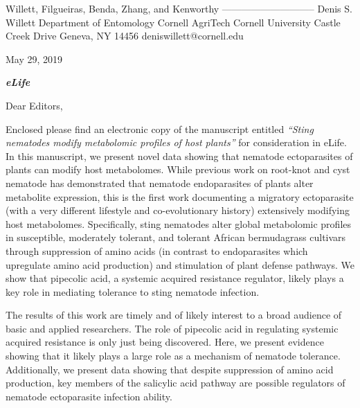 \documentclass{article}
\begin{document}
\begin{addmargin}[2.8in]{}
Willett, Filgueiras, \newline
Benda, Zhang, and Kenworthy \newline
----------------------------- \newline
Denis S. Willett\newline
Department of Entomology \newline
Cornell AgriTech  \newline
Cornell University  Castle Creek Drive \newline
Geneva, NY 14456 \newline
deniswillett@cornell.edu \newline
\end{addmargin}
\setlength{\parindent}{0cm}

May 29, 2019

\vspace{1.24em}

\textbf{\textit{eLife}}

\vspace{1.24em}

Dear Editors,

\vspace{0.48em}
\setlength{\parindent}{1.24cm}

Enclosed please find an electronic copy of the manuscript entitled \textit{“Sting nematodes modify metabolomic profiles of host plants”} for consideration in eLife.  In this manuscript, we present novel data showing that nematode ectoparasites of plants can modify host metabolomes.  While previous work on root-knot and cyst nematode has demonstrated that nematode endoparasites of plants alter metabolite expression, this is the first work documenting a migratory ectoparasite (with a very different lifestyle and co-evolutionary history) extensively modifying host metabolomes.  Specifically, sting nematodes alter global metabolomic profiles in susceptible, moderately tolerant, and tolerant African bermudagrass cultivars through suppression of amino acids (in contrast to endoparasites which upregulate amino acid production) and stimulation of plant defense pathways.  We show that pipecolic acid, a systemic acquired resistance regulator, likely plays a key role in mediating tolerance to sting nematode infection.  


The results of this work are timely and of likely interest to a broad audience of basic and applied researchers. The role of pipecolic acid in regulating systemic acquired resistance is only just being discovered.  Here, we present evidence showing that it likely plays a large role as a mechanism of nematode tolerance.  Additionally, we present data showing that despite suppression of amino acid production, key members of the salicylic acid pathway are possible regulators of nematode ectoparasite infection ability.  
\end{document}
